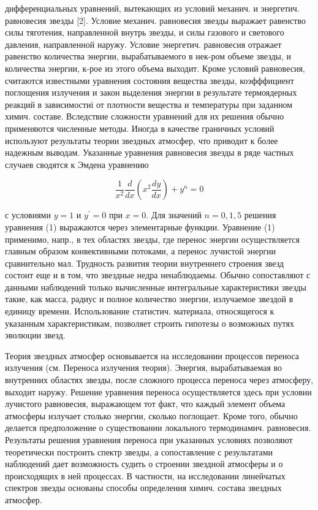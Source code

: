 \documentclass[10pt]{article}
\begin{document}
дифференциальных уравнений, вытекающих из условий механич. и энергетич. равновесия звезды [2]. Условие механич. равновесия звезды выражает равенство силы тяготения, направленной внутрь звезды, и силы газового и светового давления, направленной наружу. Условие энергетич. равновесия отражает равенство количества энергии, вырабатываемого в нек-ром объеме звезды, и количества энергии, к-рое из этого объема выходит. Кроме условий равновесия, считаются известными уравнения состояния вещества звезды, коэфффициент поглощения излучения и закон выделения энергии в результате термоядерных реакций в зависимостиі от плотности вещества и температуры при заданном химич. составе. Вследствие сложности уравнений для их решения обычно применяются численные методы. Иногда в качестве граничных условий используют результаты теории звездных атмосфер, что приводит к более надежным выводам. Указанные уравнения равновесия звезды в ряде частных случаев сводятся к Эмдена уравнению



\[

\frac{1}{x^{2}} \frac{d}{d x}\left(x^{2} \frac{d y}{d x}\right)+y^{n}=0

\]



с условиями $y=1$ и $y^{\prime}=0$ при $x=0$. Для значений $n=0,1,5$ решения уравнения (1) выражаются через элементарные функции. Уравнение (1) применимо, напр., в тех областях звезды, где перенос энергии осуществляется главным образом конвективными потоками, а перенос лучистой энергии сравнительно мал. Трудность развития теории внутреннего строения звезд состоит еще и в том, что звездные недра ненаблюдаемы. Обычно сопоставляют с данными наблюдений только вычисленные интегральные характеристики звезды такие, как масса, радиус и полное количество энергии, излучаемое звездой в единицу времени. Использование статистич. материала, относящегося к указанным характеристикам, позволяет строить гипотезы о возможных путях эволюции звезд.



Теория звездных атмосфер основывается на исследовании процессов переноса излучения (см. Переноса излучения теория). Энергия, вырабатываемая во внутренних областях звезды, после сложного процесса переноса через атмосферу, выходит наружу. Решение уравнения переноса осуществляется здесь при условии лучистого равновесия, выражающем тот факт, что каждый элемент объема атмосферы излучает столько энергии, сколько поглощает. Кроме того, обычно делается предположение о существовании локального термодинамич. равновесия. Результаты решения уравнения переноса при указанных условиях позволяют теоретически построить спектр звезды, а сопоставление с результатами наблюдений дает возможность судить о строении звездной атмосферы и о происходящих в ней процессах. В частности, на исследовании линейчатых спектров звезды основаны способы определения химич. состава звездных атмосфер.
\end{document}
